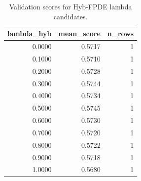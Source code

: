 \begin{table}[t]
\caption{Validation scores for Hyb-FPDE lambda candidates.}
\label{tab:lambda_distribution_computed}
\centering
\begin{tabular}{rrr}
\toprule
lambda\_hyb & mean\_score & n\_rows \\
\midrule
0.0000 & 0.5717 & 1 \\
0.1000 & 0.5710 & 1 \\
0.2000 & 0.5728 & 1 \\
0.3000 & 0.5744 & 1 \\
0.4000 & 0.5734 & 1 \\
0.5000 & 0.5745 & 1 \\
0.6000 & 0.5730 & 1 \\
0.7000 & 0.5720 & 1 \\
0.8000 & 0.5722 & 1 \\
0.9000 & 0.5718 & 1 \\
1.0000 & 0.5680 & 1 \\
\bottomrule
\end{tabular}

\end{table}
